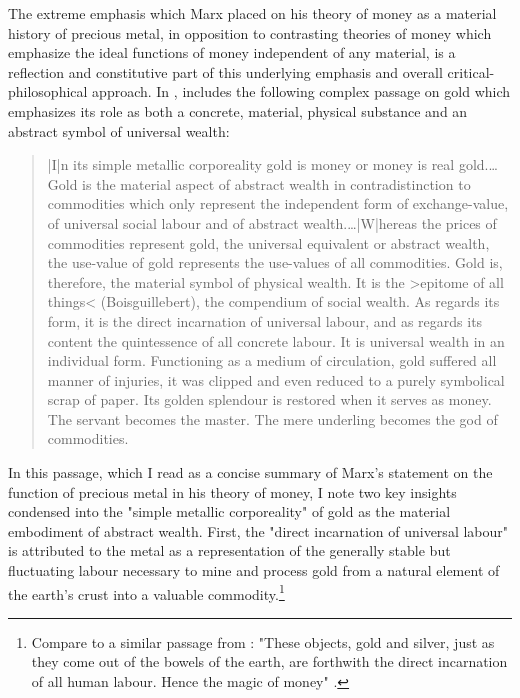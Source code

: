 The extreme emphasis which Marx placed on his theory of money as a material history of precious metal, in opposition to contrasting theories of money which emphasize the ideal functions of money independent of any material, is a reflection and constitutive part of this underlying emphasis and overall critical-philosophical approach. In , \citeauthor{MarxCPE} includes the following complex passage on gold which emphasizes its role as both a concrete, material, physical substance and an abstract symbol of universal wealth:
\blockcquote[ch.~2.3]{MarxCPE}{
  |I|n its simple metallic corporeality gold is money or money is real gold.…Gold is the material aspect of abstract wealth in contradistinction to commodities which only represent the independent form of exchange-value, of universal social labour and of abstract wealth.…|W|hereas the prices of commodities represent gold, the universal equivalent or abstract wealth, the use-value of gold represents the use-values of all commodities. Gold is, therefore, the material symbol of physical wealth. It is the >epitome of all things< (Boisguillebert), the compendium of social wealth. As regards its form, it is the direct incarnation of universal labour, and as regards its content the quintessence of all concrete labour. It is universal wealth in an individual form. Functioning as a medium of circulation, gold suffered all manner of injuries, it was clipped and even reduced to a purely symbolical scrap of paper. Its golden splendour is restored when it serves as money. The servant becomes the master. The mere underling becomes the god of commodities.
}
In this passage, which I read as a concise summary of Marx's statement on the function of precious metal in his theory of money, I note two key insights condensed into the "simple metallic corporeality" of gold as the material embodiment of abstract wealth. First, the "direct incarnation of universal labour" is attributed to the metal as a representation of the generally stable but fluctuating labour necessary to mine and process gold from a natural element of the earth's crust into a valuable commodity.\footnote{
  Compare to a similar passage from : "These objects, gold and silver, just as they come out of the bowels of the earth, are forthwith the direct incarnation of all human labour. Hence the magic of money" \autocite[ch.~2.]{MarxCapital}.
}
